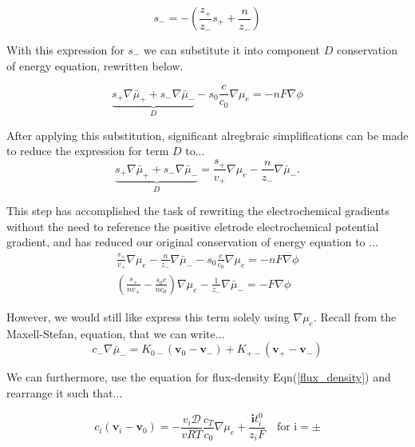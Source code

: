 \documentclass[lettersize,journal]{IEEEtran}
\begin{document}
\begin{equation}\label{signed_stoich_coef}
    s_{-} =-\left(\frac{z_{+}}{z_{-}} s_{+}+\frac{n}{z_{-}}\right)
\end{equation}

\noindent With this expression for $s_{-} $ we can substitute it into component $D$ conservation of energy equation, rewritten below.


\begin{equation}
\underbrace{s_{+} \nabla \bar{\mu}_{+}+s_{-} \nabla \bar{\mu}_{-}}_{D}-s_{0} \frac{c}{c_{0}} \nabla \mu_{e}=-n F \nabla \phi
\end{equation}

\noindent After applying this substitution, significant alregbraic simplifications can be made to reduce the expression for term $D$ to...
\begin{equation}
\underbrace{s_{+} \nabla \bar{\mu}_{+}+s_{-} \nabla \bar{\mu}_{-}}_{D} =\frac{s_{+}}{v_{+}} \nabla \mu_{e}-\frac{n}{z_{-}} \nabla \bar{\mu}_{-} .
\end{equation}

\noindent This step has accomplished the task of rewriting the electrochemical gradients without the need to reference the positive eletrode electrochemical potential gradient, and has reduced our original conservation of energy equation to ...
\begin{equation}\label{grad_mu_e_n_grad_mu_n}
\begin{array}{l}
\frac{s_{+}}{v_{+}} \nabla \mu_{e}-\frac{n}{z_{-}} \nabla \bar{\mu}_{-}-s_{0} \frac{c}{c_{0}} \nabla \mu_{e}=-n F \nabla \phi \\
\left(\frac{s_{+}}{n v_{+}}-\frac{s_{0} c}{n c_{0}}\right) \nabla \mu_{e}-\frac{1}{z_{-}} \nabla \bar{\mu}_{-}=-F \nabla \phi
\end{array}
\end{equation}

\noindent However, we would still like express this term solely using $\nabla \mu_{e}$. Recall from the Maxell-Stefan, equation, that we can write...
\begin{equation}\label{max_n_stefy}
c_{-} \nabla \bar{\mu}_{-}=K_{0-}\left(\mathbf{v}_{0}-\mathbf{v}_{-}\right)+K_{+-}\left(\mathbf{v}_{+}-\mathbf{v}_{-}\right)
\end{equation}

We can furthermore, use the equation for flux-density Eqn(\ref{flux_density}) and rearrange it such that...

\begin{equation}\label{flux_density}
c_{i}\left(\mathbf{v}_{i}-\mathbf{v}_{0}\right) =-\frac{v_{i} \mathscr{D}}{v R T} \frac{c_{T}}{c_{0}} \nabla \mu_{e}+\frac{\mathbf{i} t_{i}^{0}}{z_{i} F} \quad \text{for i} = \pm
\end{equation}
\end{document}
